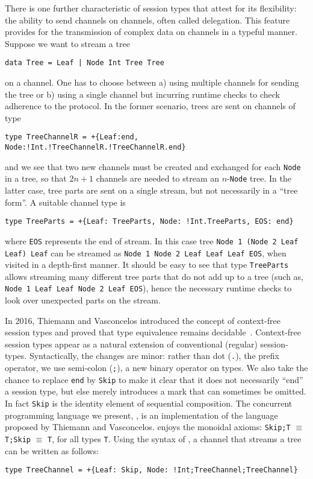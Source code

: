There is one further characteristic of session types that attest for
its flexibility: the ability to send channels on channels, often called
delegation. This feature provides for the transmission of complex data
on channels in a typeful manner. Suppose we want to stream a tree
%
\begin{lstlisting}
data Tree = Leaf | Node Int Tree Tree
\end{lstlisting}
%
on a channel. One has to choose between a) using multiple channels for
sending the tree or b) using a single channel but incurring runtime
checks to check adherence to the protocol. In the former scenario,
trees are sent on channels of type
%
\begin{lstlisting}[morekeywords=end]
type TreeChannelR = +{Leaf:end, Node:!Int.!TreeChannelR.!TreeChannelR.end}
\end{lstlisting}
%
and we see that two new channels must be created and exchanged for
each \lstinline|Node| in a tree, so that $2n+1$ channels are needed to
stream an $n$-\lstinline|Node| tree.
%
In the latter case, tree parts are sent on a single stream, but not
necessarily in a ``tree form''. A suitable channel type is
%
\begin{lstlisting}[morekeywords=end]
type TreeParts = +{Leaf: TreeParts, Node: !Int.TreeParts, EOS: end}
\end{lstlisting}
%
where \lstinline|EOS| represents the end of stream. In this case tree
\lstinline|Node 1 (Node 2 Leaf Leaf) Leaf| can be streamed as
\lstinline|Node 1 Node 2 Leaf Leaf Leaf EOS|, when visited in a
depth-first manner. It should be easy to see that type
\lstinline|TreeParts| allows streaming many different tree parts that
do not add up to a tree (such as,
%
\lstinline|Node 1 Leaf Leaf Node 2 Leaf EOS|), hence the necessary
runtime checks to look over unexpected parts on the stream.

In 2016, Thiemann and Vasconcelos introduced the concept of
context-free session types and proved that type equivalence remains
decidable~\cite{DBLP:conf/icfp/ThiemannV16}.
%
Context-free session types appear as a natural extension of
conventional (regular) session-types. Syntactically, the changes are
minor: rather than dot (\lstinline|.|), the prefix operator, we use
semi-colon (\lstinline|;|), a new binary operator on types. We also
take the chance to replace \lstinline [morekeywords=end]|end| by
\lstinline|Skip| to make it clear that it does not necessarily ``end''
a session type, but else merely introduces a mark that can sometimes
be omitted. In fact \lstinline|Skip| is the identity element of
sequential composition. The concurrent programming language
we present, \freest, is an implementation of the
language proposed by Thiemann and Vasconcelos.
\freest{} enjoys the monoidal axioms:
\lstinline|Skip;T| $\equiv$ \lstinline|T;Skip| $\equiv$ \lstinline|T|,
for all types \lstinline|T|.
%
Using the syntax of \freest, a channel that streams a tree can be
written as follows:
%
\begin{lstlisting}
type TreeChannel = +{Leaf: Skip, Node: !Int;TreeChannel;TreeChannel}
\end{lstlisting}

